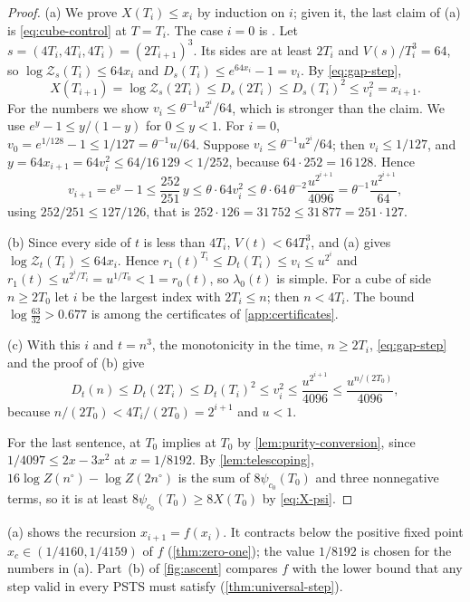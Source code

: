 \documentclass[11pt,a4paper]{amsart}
\theoremstyle{definition}
\theoremstyle{remark}
\numberwithin{equation}{section}
\newcommand{\PSTS}{\textup{PSTS}}          %
\newcommand{\TT}{\mathbb{T}}               %
\newcommand{\Zc}{\mathcal{Z}}              %
\newcommand{\Zs}[2]{\Zc_{#1}(#2)}          %
\newcommand{\Dexc}[2]{D_{#1}(#2)}          %
\newcommand{\psiT}[2]{\psi_{#1}(#2)}       %
\newcommand{\Vol}[1]{V(#1)}                %
\newcommand{\cube}[1]{(2#1)^3}             %
\newcommand{\lzero}{\lambda_0}             %
\newcommand{\dconst}{\frac{1}{4097}}       %
\newcommand{\xconst}{\frac{1}{8192}}       %
\newcommand{\dconstinl}{1/4097}            %
\newcommand{\xconstinl}{1/8192}            %
\newcommand{\Mcirc}{\text{\upshape(M$^{\circ}$)}}   %
\newcommand{\Bcirc}{\text{\upshape(B$^{\circ}$)}}   %
\begin{document}
\begin{proof}
(a) We prove $X(T_i)\le x_i$ by induction on $i$; given it, the last claim of (a) is \eqref{eq:cube-control} at $T=T_i$. The case $i=0$ is \Bcirc{}. Let $s=(4T_i,4T_i,4T_i)=\cube{T_{i+1}}$. Its sides are at least $2T_i$ and $\Vol{s}/T_i^3=64$, so $\log\Zs{s}{T_i}\le64x_i$ and $\Dexc{s}{T_i}\le e^{64x_i}-1=v_i$. By \eqref{eq:gap-step},
\[
X(T_{i+1})=\log\Zs{s}{2T_i}\le\Dexc{s}{2T_i}\le\Dexc{s}{T_i}^2\le v_i^2=x_{i+1}.
\]
For the numbers we show $v_i\le\theta^{-1}u^{2^i}/64$, which is stronger than the claim. We use $e^y-1\le y/(1-y)$ for $0\le y<1$. For $i=0$, $v_0=e^{1/128}-1\le1/127=\theta^{-1}u/64$. Suppose $v_i\le\theta^{-1}u^{2^i}/64$; then $v_i\le1/127$, and $y=64x_{i+1}=64v_i^2\le64/16\,129<1/252$, because $64\cdot252=16\,128$. Hence
\[
v_{i+1}=e^y-1\le\frac{252}{251}\,y\le\theta\cdot64v_i^2\le\theta\cdot64\,\theta^{-2}\frac{u^{2^{i+1}}}{4096}=\theta^{-1}\frac{u^{2^{i+1}}}{64},
\]
using $252/251\le127/126$, that is $252\cdot126=31\,752\le31\,877=251\cdot127$.

(b) Since every side of $t$ is less than $4T_i$, $\Vol{t}<64T_i^3$, and (a) gives $\log\Zs{t}{T_i}\le64x_i$. Hence $r_1(t)^{T_i}\le\Dexc{t}{T_i}\le v_i\le u^{2^i}$ and $r_1(t)\le u^{2^i/T_i}=u^{1/T_0}<1=r_0(t)$, so $\lzero(t)$ is simple. For a cube of side $n\ge2T_0$ let $i$ be the largest index with $2T_i\le n$; then $n<4T_i$. The bound $\log\frac{63}{32}>0.677$ is among the certificates of \cref{app:certificates}.

(c) With this $i$ and $t=n^3$, the monotonicity in the time, $n\ge2T_i$, \eqref{eq:gap-step} and the proof of (b) give
\[
\Dexc{t}{n}\le\Dexc{t}{2T_i}\le\Dexc{t}{T_i}^2\le v_i^2\le\frac{u^{2^{i+1}}}{4096}\le\frac{u^{n/(2T_0)}}{4096},
\]
because $n/(2T_0)<4T_i/(2T_0)=2^{i+1}$ and $u<1$.

For the last sentence, \Mcirc{} at $T_0$ implies \Bcirc{} at $T_0$ by \cref{lem:purity-conversion}, since $\dconstinl\le2x-3x^2$ at $x=\xconstinl$. By \cref{lem:telescoping}, $16\log Z(n^\circ)-\log Z(2n^\circ)$ is the sum of $8\psiT{c_0}{T_0}$ and three nonnegative terms, so it is at least $8\psiT{c_0}{T_0}\ge8X(T_0)$ by \eqref{eq:X-psi}.
\end{proof}

(a) shows the recursion $x_{i+1}=f(x_i)$. It contracts below the positive fixed point $x_c\in(1/4160,1/4159)$ of $f$ (\cref{thm:zero-one}); the value $\xconstinl$ is chosen for the numbers in (a). Part~(b) of \cref{fig:ascent} compares $f$ with the lower bound that any step valid in every \PSTS{} must satisfy (\cref{thm:universal-step}).
\end{document}
